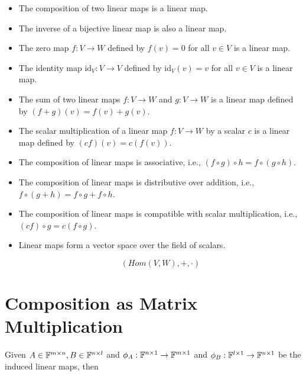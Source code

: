\begin{itemize}
    
    \item The composition of two linear maps is a linear map.
    
    \item The inverse of a bijective linear map is also a linear map.
    
    \item The zero map \( f: V \to W \) defined by \( f(v) = 0 \) 
          for all \( v \in V \) is a linear map.
    
    \item The identity map \( \text{id}_V: V \to V \) defined by \( \text{id}_V(v) = v \) for all 
          \( v \in V \) is a linear map.
    
    \item The sum of two linear maps \( f: V \to W \) 
          and \( g: V \to W \) is a linear map defined by \( (f + g)(v) = f(v) + g(v) \).
    
    \item The scalar multiplication of a linear map \( f: V \to W \) by a scalar \( c \) is a linear 
          map defined by \( (cf)(v) = c(f(v)) \).
    
    \item The composition of linear maps is associative, i.e., \( (f \circ g) \circ h = f \circ (g \circ h) \).
    
    \item The composition of linear maps is distributive over addition, i.e., 
          \( f \circ (g + h) = f \circ g + f \circ h \).
    
    \item The composition of linear maps is compatible with scalar multiplication, i.e., 
          \( (cf) \circ g = c(f \circ g) \).
    
    \item Linear maps form a vector space 
          over the field of scalars.
          
          \[
            (Hom(V,W), +, \cdot )
          \]

\end{itemize}

\section{Composition as Matrix Multiplication}

Given \(A \in \mathbb{F}^{m \times n}, B \in \mathbb{F}^{n \times l}\) and  \(\phi_A: \mathbb{F}^{n \times 1} \to \mathbb{F}^{m \times 1}\) and 
\(\phi_B: \mathbb{F}^{l \times 1} \to \mathbb{F}^{n \times 1}\) be the induced linear maps, then 

